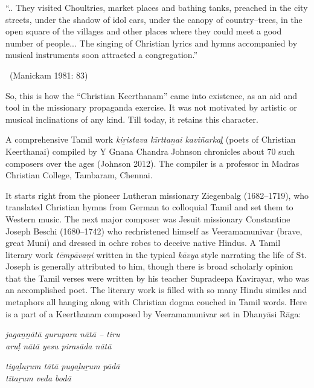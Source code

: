 \begin{myquote}
“.. They visited Choultries, market places and bathing tanks, preached in the city streets, under the shadow of idol cars, under the canopy of country–trees, in the open square of the villages and other places where they could meet a good number of people... The singing of Christian lyrics and hymns accompanied by musical instruments soon attracted a congregation.” 

~\hfill (Manickam 1981: 83)
\end{myquote}

So, this is how the “Christian Keerthanam” came into existence, as an aid and tool in the missionary propaganda exercise. It was not motivated by artistic or musical inclinations of any kind. Till today, it retains this character.

A comprehensive Tamil work \textit{kiṟistava kīrttaṉai kaviñarkal̤} (poets of Christian Keerthanai) compiled by Y Gnana Chandra Johnson chronicles about 70 such composers over the ages (Johnson 2012). The compiler is a professor in Madras Christian College, Tambaram, Chennai.

It starts right from the pioneer Lutheran missionary Ziegenbalg (1682–1719), who translated Christian hymns from German to colloquial Tamil and set them to Western music. The next major composer was Jesuit missionary Constantine Joseph Beschi (1680–1742) who rechristened himself as Veeramamunivar (brave, great Muni) and dressed in ochre robes to deceive native Hindus. A Tamil literary work \textit{tēmpāvaṇi }written in the typical \textit{kāvya} style narrating the life of St. Joseph is generally attributed to him, though there is broad scholarly opinion that the Tamil verses were written by his teacher Supradeepa Kavirayar, who was an accomplished poet. The literary work is filled with so many Hindu similes and metaphors all hanging along with Christian dogma couched in Tamil words. Here is a part of a Keerthanam composed by Veeramamunivar set in Dhanyāsi Rāga:

\begin{myquote}
\textit{jagaṉṉātā gurupara nātā – tiru \\ aruḷ nātā yesu pirasāda nātā }
\end{myquote}

\begin{myquote}
\textit{tigaḻuṟum tātā pugaḻuṟum pādā\\ tītaṟum veda bodā}
\end{myquote}

